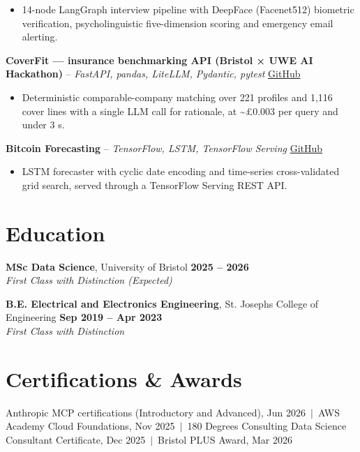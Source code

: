 \documentclass[a4paper,11pt]{article}
\begin{document}
\begin{itemize}
  \item 14-node LangGraph interview pipeline with DeepFace (Facenet512) biometric verification, psycholinguistic five-dimension scoring and emergency email alerting.
\end{itemize}
\vspace{3pt}
\noindent\textbf{CoverFit — insurance benchmarking API (Bristol × UWE AI Hackathon)} -- \textit{FastAPI, pandas, LiteLLM, Pydantic, pytest} \hfill \href{https://github.com/Thiruvel-AP/AIHackathon-Phoenix}{GitHub}
\begin{itemize}
  \item Deterministic comparable-company matching over 221 profiles and 1,116 cover lines with a single LLM call for rationale, at \textasciitilde{}£0.003 per query and under 3 s.
\end{itemize}
\vspace{3pt}
\noindent\textbf{Bitcoin Forecasting} -- \textit{TensorFlow, LSTM, TensorFlow Serving} \hfill \href{https://github.com/Thiruvel-AP/BitcoinForecasting}{GitHub}
\begin{itemize}
  \item LSTM forecaster with cyclic date encoding and time-series cross-validated grid search, served through a TensorFlow Serving REST API.
\end{itemize}

\section{Education}
\textbf{MSc Data Science}, University of Bristol \hfill \textbf{2025 – 2026}\\ \textit{First Class with Distinction (Expected)}\par
\vspace{3pt}
\textbf{B.E. Electrical and Electronics Engineering}, St. Joseph\textquotesingle{}s College of Engineering \hfill \textbf{Sep 2019 – Apr 2023}\\ \textit{First Class with Distinction}\par

\section{Certifications \& Awards}
Anthropic MCP certifications (Introductory and Advanced), Jun 2026 \,$|$\, AWS Academy Cloud Foundations, Nov 2025 \,$|$\, 180 Degrees Consulting Data Science Consultant Certificate, Dec 2025 \,$|$\, Bristol PLUS Award, Mar 2026
\end{document}
